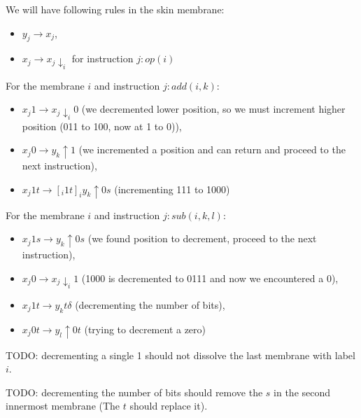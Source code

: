 \documentclass[llncs,submission,copyright,creativecommons]{../lib/lncs/llncs}
\begin{document}
We will have following rules in the skin membrane:
\begin{itemize}
  \item $y_j \rightarrow x_j$,
  \item $x_j \rightarrow x_j\downarrow_{i}$ for instruction $j: op(i)$
\end{itemize}

For the membrane $i$ and instruction $j: add(i,k)$:
\begin{itemize}
  \item $x_j1 \rightarrow x_j\downarrow_{i}0$ (we decremented lower position, so we must increment higher position (011 to 100, now at 1 to 0)),
  \item $x_j0 \rightarrow y_k \uparrow 1$ (we incremented a position and can return and proceed to the next instruction),
  \item $x_j1t \rightarrow [_i 1t]_iy_k\uparrow 0s$ (incrementing 111 to 1000)
\end{itemize}

For the membrane $i$ and instruction $j: sub(i,k,l)$:
\begin{itemize}
  \item $x_j1s \rightarrow y_k \uparrow 0s$ (we found position to decrement, proceed to the next instruction),
  \item $x_j0 \rightarrow x_j\downarrow_i 1$ (1000 is decremented to 0111 and now we encountered a 0),
  \item $x_j1t \rightarrow y_kt \delta$ (decrementing the number of bits),
  \item $x_j0t \rightarrow y_l \uparrow 0t$ (trying to decrement a zero)
\end{itemize}

TODO: decrementing a single 1 should not dissolve the last membrane with label $i$.

TODO: decrementing the number of bits should remove the $s$ in the second innermost membrane (The $t$ should replace it).
\end{document}
